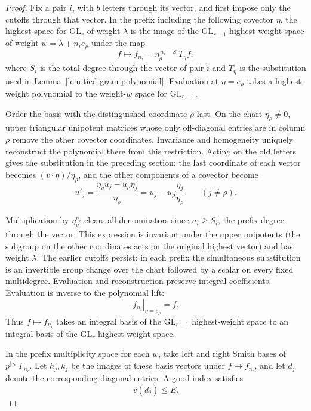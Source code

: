 \begin{proof}
Fix a pair \(i\), with \(b\) letters through its vector, and first
impose only the cutoffs through that vector. In the prefix
including the following covector \(\eta\), the highest space for
\(\mathrm{GL}_r\) of weight \(\lambda\) is the image of the \(\mathrm{GL}_{r-1}\) highest-weight space of weight
\(w=\lambda+n_i e_\rho\) under the map
\[
 f\longmapsto f_{n_i}=\eta_\rho^{\,n_i-S_i}T_\eta f ,
\]
where \(S_i\) is the total degree through the vector of pair \(i\) and
\(T_\eta\) is the substitution used in Lemma~\ref{lem:tied-gram-polynomial}.
Evaluation at \(\eta=e_\rho\) takes a highest-weight polynomial to the
weight-\(w\) space for \(\mathrm{GL}_{r-1}\).

Order the basis with the distinguished coordinate \(\rho\) last.
On the chart \(\eta_\rho\ne0\), upper triangular unipotent matrices
whose only off-diagonal entries are in column \(\rho\) remove the other covector
coordinates. Invariance and homogeneity uniquely reconstruct the
polynomial there from this restriction. Acting on the old
letters gives the substitution in the preceding section:
the last coordinate of each vector becomes
\((v\cdot\eta)/\eta_\rho\), and the other components of a covector become
\[
 u'_j=\frac{\eta_\rho u_j-u_\rho\eta_j}{\eta_\rho}=u_j-u_\rho\frac{\eta_j}{\eta_\rho}\qquad(j\ne\rho).
\]

Multiplication by \(\eta_\rho^{n_i}\) clears all denominators
since \(n_i\ge S_i\), the prefix degree through the vector.
This expression is invariant under the upper unipotents (the
subgroup on the other coordinates acts on the original highest
vector) and has weight \(\lambda\). The earlier cutoffs persist:
in each prefix the simultaneous substitution is an invertible
group change over the chart followed by a scalar on every fixed
multidegree. Evaluation and reconstruction preserve integral
coefficients. Evaluation is inverse to the polynomial lift:
\[
 \left.f_{n_i}\right|_{\eta=e_\rho}=f .
\]
Thus \(f\mapsto f_{n_i}\) takes an integral basis of the
\(\mathrm{GL}_{r-1}\) highest-weight space to an integral basis of the
\(\mathrm{GL}_r\) highest-weight space.

In the prefix multiplicity space for each \(w\), take left and
right Smith bases of \(p^{\lceil\kappa\rceil}\Gamma_{n_i}\).
Let \(h_j,k_j\) be the images of these basis vectors under
\(f\mapsto f_{n_i}\), and let \(d_j\) denote
the corresponding diagonal entries. A good index satisfies
\[
 v(d_j)\le E.
\]


\end{proof}
